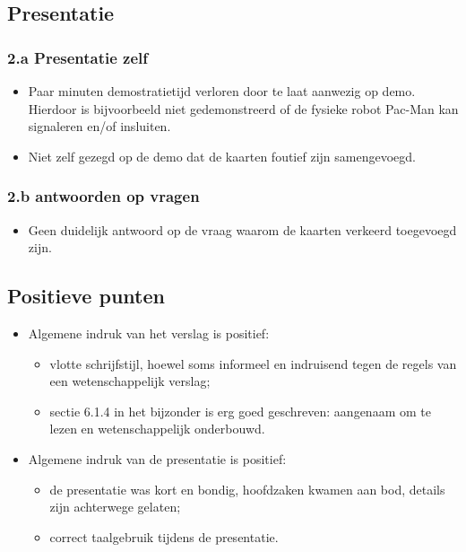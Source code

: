 \documentclass[12pt,a4paper]{report}
\begin{document}
\subsection{Presentatie}

	\subsubsection{2.a Presentatie zelf}
\begin{itemize}
 \item Paar minuten demostratietijd verloren door te laat aanwezig op demo. Hierdoor is bijvoorbeeld niet gedemonstreerd of de fysieke robot Pac-Man kan signaleren en/of insluiten.
 \item Niet zelf gezegd op de demo dat de kaarten foutief zijn samengevoegd.
\end{itemize}

     \subsubsection{2.b antwoorden op vragen}
\begin{itemize}
	\item    Geen duidelijk antwoord op de vraag waarom de kaarten verkeerd toegevoegd zijn.
 
\end{itemize}
\subsection{ Positieve punten}

\begin{itemize}
 \item Algemene indruk van het verslag is positief:
 
\begin{itemize}
	\item vlotte schrijfstijl, hoewel soms informeel en indruisend tegen de regels van een wetenschappelijk verslag;
	\item sectie 6.1.4 in het bijzonder is erg goed geschreven: aangenaam om te lezen en wetenschappelijk onderbouwd.
\end{itemize}
 \item Algemene indruk van de presentatie is positief:
\begin{itemize}
	\item de presentatie was kort en bondig, hoofdzaken kwamen aan bod, details zijn achterwege gelaten;
	\item correct taalgebruik tijdens de presentatie.
\end{itemize}
\end{itemize}
\end{document}
